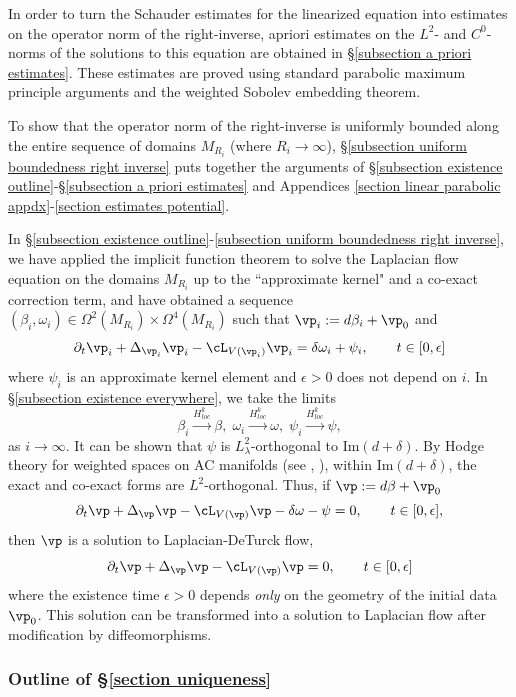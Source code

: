 \documentclass[hidelinks, 12pt, oneside, reqno]{amsart}
\begin{document}
In order to turn the Schauder estimates for the linearized equation into estimates on the operator norm of the right-inverse, apriori estimates on the $L^2$- and $C^0$-norms of the solutions to this equation are obtained in \S \ref{subsection a priori estimates}. These estimates are proved using standard parabolic maximum principle arguments and the weighted Sobolev embedding theorem.

To show that the operator norm of the right-inverse is uniformly bounded along the entire sequence of domains $M_{R_i}$ (where $R_i \rightarrow \infty$), \S \ref{subsection uniform boundedness right inverse} puts together the arguments of \S \ref{subsection existence outline}-\S \ref{subsection a priori estimates} and Appendices \ref{section linear parabolic appdx}-\ref{section estimates potential}. 

In \S \ref{subsection existence outline}-\ref{subsection uniform boundedness right inverse}, we have applied the implicit function theorem to solve the Laplacian flow equation on the domains $M_{R_i}$ up to the ``approximate kernel" and a co-exact correction term, and have obtained a sequence $(\beta_i, \omega_i) \in \Omega^2(M_{R_i}) \times \Omega^4(M_{R_i})$ such that $\vp_i := d\beta_i + \vp_0$ and
    \[
    \partial_t \vp_i + \Delta_{\vp_i}\vp_i - \cL_{V(\vp_i)} \vp_i = \delta \omega_i + \psi_i, \qquad t \in [0, \epsilon]
    \]
where $\psi_i$ is an approximate kernel element and $\epsilon >0$ does not depend on $i$. In \S \ref{subsection existence everywhere}, we take the limits 
\[
    \beta_i \xrightarrow{H^k_{loc}} \beta,\; \omega_i \xrightarrow{H^k_{loc}} \omega, \; \psi_i \xrightarrow{H^k_{loc}} \psi,
\]
as $i \rightarrow \infty$. It can be shown that $\psi$ is $L_{\lambda}^2$-orthogonal to $\mathrm{Im}(d + \delta)$. By Hodge theory for weighted spaces on AC manifolds (see \cite{KarigiannisLotay}, \cite{Lockhart1987}), within $\mathrm{Im}(d + \delta)$, the exact and co-exact forms are $L^2$-orthogonal. Thus, if $\vp := d\beta + \vp_0$
    \[
    \partial_t \vp + \Delta_{\vp}\vp - \cL_{V(\vp)} \vp - \delta \omega - \psi = 0, \qquad t \in [0, \epsilon],
    \]
    then $\vp$ is a solution to Laplacian-DeTurck flow,
    \[
    \partial_t \vp + \Delta_{\vp}\vp - \cL_{V(\vp)} \vp = 0, \qquad t \in [0, \epsilon]
    \]
where the existence time $\epsilon > 0$ depends \textit{only} on the geometry of the initial data $\vp_0$. This solution can be transformed into a solution to Laplacian flow after modification by diffeomorphisms. 

\subsubsection{Outline of \S \ref{section uniqueness}}
\end{document}
